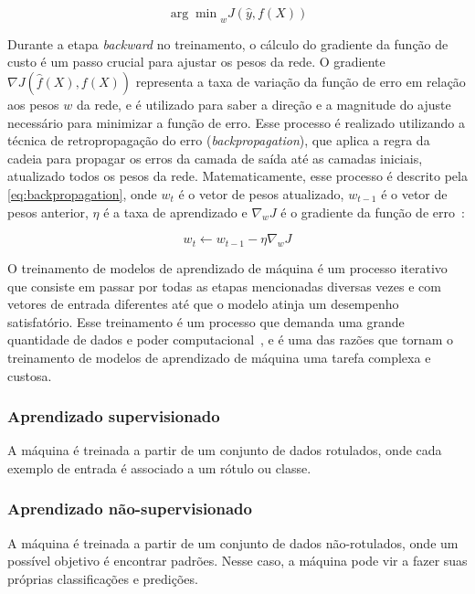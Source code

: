 \documentclass[journal]{IEEEtran}
\begin{document}
\begin{equation}
    {\arg\min}_{w} J(\hat{y}, f(X))
\end{equation}

Durante a etapa \textit{backward} no treinamento, o cálculo do gradiente da função de custo é um passo crucial para ajustar os pesos da rede.
O gradiente $\nabla J(\hat{f}(X), f(X))$ representa a taxa de variação da função de erro em relação aos pesos $w$ da rede, e é utilizado para saber a direção e a magnitude do ajuste necessário para minimizar a função de erro.
Esse processo é realizado utilizando a técnica de retropropagação do erro (\textit{backpropagation}), que aplica a regra da cadeia para propagar os erros da camada de saída até as camadas iniciais, atualizado todos os pesos da rede.
Matematicamente, esse processo é descrito pela \autoref{eq:backpropagation}, onde $w_t$ é o vetor de pesos atualizado, $w_{t-1}$ é o vetor de pesos anterior, $\eta$ é a taxa de aprendizado e $\nabla_w J$ é o gradiente da função de erro~\cite{Goodfellow-et-al-2016,rumelhart1986learning}:

\begin{equation}\label{eq:backpropagation}
    w_t \leftarrow w_{t-1} - \eta \nabla_w J
\end{equation}

O treinamento de modelos de aprendizado de máquina é um processo iterativo que consiste em passar por todas as etapas mencionadas diversas vezes e com vetores de entrada diferentes até que o modelo atinja um desempenho satisfatório.
Esse treinamento é um processo que demanda uma grande quantidade de dados e poder computacional~\cite{touvron2023llama,touvron2023llama2,meta2024llama3,hu2021lora,raschka2018model}, e é uma das razões que tornam o treinamento de modelos de aprendizado de máquina uma tarefa complexa e custosa.

\subsubsection{Aprendizado supervisionado}
A máquina é treinada a partir de um conjunto de dados rotulados, onde cada exemplo de entrada é associado a um rótulo ou classe.

\subsubsection{Aprendizado não-supervisionado}
A máquina é treinada a partir de um conjunto de dados não-rotulados, onde um possível objetivo é encontrar padrões.
Nesse caso, a máquina pode vir a fazer suas próprias classificações e predições.
\end{document}
